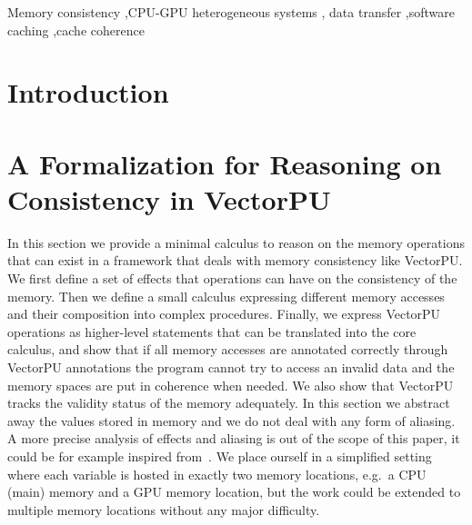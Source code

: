 \documentclass[preprint,12pt]{elsarticle}
\begin{document}
\begin{frontmatter}
\begin{abstract}
\end{abstract}

\begin{keyword}
Memory consistency \sep CPU-GPU heterogeneous systems \sep  
data transfer \sep  software caching \sep  cache coherence 


\end{keyword}

\end{frontmatter}

\section{Introduction}



\section{A Formalization for Reasoning on  Consistency in VectorPU}\label{sec:Formal}

In this section we provide a minimal calculus to reason on the memory operations that can 
exist in a framework that deals with memory consistency like VectorPU. We first define a 
set of effects that operations can have on the consistency of the memory. Then we define a 
small calculus expressing different memory accesses and their composition into complex 
procedures. Finally, we express VectorPU operations as higher-level statements that can 
be translated  into the core calculus, and show that if all memory 
accesses are annotated correctly through VectorPU annotations the program cannot try to 
access an invalid data and the memory spaces are put in coherence when needed. We also 
show that VectorPU tracks the validity status of the memory adequately. In this 
section we abstract away the values stored in memory and we 
do not deal with any form of aliasing. A more precise analysis of effects and aliasing is 
out of the scope of this paper, it could be for example inspired 
from~\cite{Nielson1999}.
We place ourself in a simplified setting where each variable is hosted in exactly two 
memory locations, e.g.\ a CPU (main) memory and a GPU memory location, but the work could be extended to multiple memory 
locations without any major difficulty.
\end{document}
